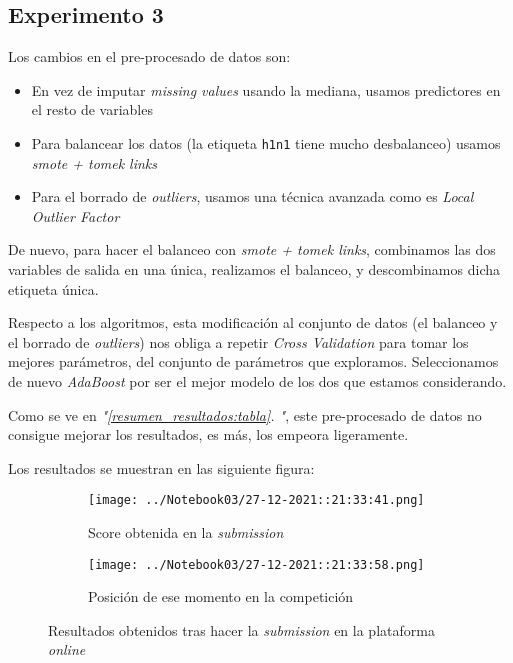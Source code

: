 \documentclass[11pt]{article}
\newcommand{\customcite}[1]{\emph{"\ref{#1}. \nameref{#1}"}}
\begin{document}
\pagebreak

\subsection{Experimento 3}

Los cambios en el pre-procesado de datos son:

\begin{itemize}
    \item En vez de imputar \emph{missing values} usando la mediana, usamos predictores en el resto de variables
    \item Para balancear los datos (la etiqueta \lstinline{h1n1} tiene mucho desbalanceo) usamos \emph{smote + tomek links}
    \item Para el borrado de \emph{outliers}, usamos una técnica avanzada como es \emph{Local Outlier Factor}
\end{itemize}

De nuevo, para hacer el balanceo con \emph{smote + tomek links}, combinamos las dos variables de salida en una única, realizamos el balanceo, y descombinamos dicha etiqueta única.

Respecto a los algoritmos, esta modificación al conjunto de datos (el balanceo y el borrado de \emph{outliers}) nos obliga a repetir \emph{Cross Validation} para tomar los mejores parámetros, del conjunto de parámetros que exploramos. Seleccionamos de nuevo \emph{AdaBoost} por ser el mejor modelo de los dos que estamos considerando.

Como se ve en \customcite{resumen_resultados:tabla}, este pre-procesado de datos no consigue mejorar los resultados, es más, los empeora ligeramente.

Los resultados se muestran en las siguiente figura:

\begin{figure}[H]
    \centering

    \begin{subfigure}[b]{0.45 \textwidth}
        \texttt{[image: ../Notebook03/27-12-2021::21:33:41.png]}
        \caption{Score obtenida en la \emph{submission}}
    \end{subfigure}
    \begin{subfigure}[b]{0.45 \textwidth}
        \texttt{[image: ../Notebook03/27-12-2021::21:33:58.png]}
        \caption{Posición de ese momento en la competición}
    \end{subfigure}

    \caption{Resultados obtenidos tras hacer la \emph{submission} en la plataforma \emph{online}}
\end{figure}
\end{document}
